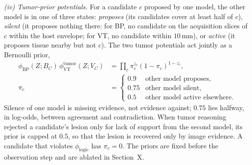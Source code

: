 \documentclass[fleqn,10pt]{olplainarticle}
\begin{document}
\textit{(iv) Tumor-prior potentials.} For a candidate $c$ proposed by one model, the other model is in one of three
states: \emph{proposes} (its candidates cover at least half of $c$), \emph{silent} (it proposes nothing there: for BP, no
candidate on the acquisition slices of $c$ within the host envelope; for VT, no candidate within $10$\,mm), or
\emph{active} (it proposes tissue nearby but not $c$). The two tumor potentials act jointly as a Bernoulli prior,
\begin{equation}
\label{eq:tumor_prior}
\begin{split}
\phi_{\mathrm{BP}}(Z;B_C)\,\phi^{\mathrm{tumor}}_{\mathrm{VT}}(Z;V_C)&=\prod_{c}\pi_c^{z_c}(1-\pi_c)^{1-z_c},\\
\pi_c&=\begin{cases}
0.9 & \text{other model proposes},\\
0.75 & \text{other model silent},\\
0.5 & \text{other model active elsewhere}.
\end{cases}
\end{split}
\end{equation}
Silence of one model is missing evidence, not evidence against; $0.75$ lies halfway, in log-odds, between agreement and
contradiction. When tumor reasoning rejected a candidate's lesion only for lack of support from the second model, its prior
is capped at $0.5$, so that the lesion is recovered only by image evidence. A candidate that violates
$\phi_{\mathrm{logic}}$ has $\pi_c=0$. The priors are fixed before the observation step and are ablated in Section~X.

\end{document}

